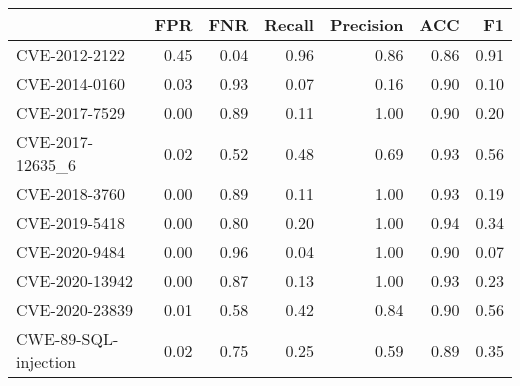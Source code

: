 \begin{tabular}{lrrrrrr}
\toprule
{} &  FPR &  FNR &  Recall &  Precision &  ACC &   F1 \\
\midrule
CVE-2012-2122        & 0.45 & 0.04 &    0.96 &       0.86 & 0.86 & 0.91 \\
CVE-2014-0160        & 0.03 & 0.93 &    0.07 &       0.16 & 0.90 & 0.10 \\
CVE-2017-7529        & 0.00 & 0.89 &    0.11 &       1.00 & 0.90 & 0.20 \\
CVE-2017-12635\_6     & 0.02 & 0.52 &    0.48 &       0.69 & 0.93 & 0.56 \\
CVE-2018-3760        & 0.00 & 0.89 &    0.11 &       1.00 & 0.93 & 0.19 \\
CVE-2019-5418        & 0.00 & 0.80 &    0.20 &       1.00 & 0.94 & 0.34 \\
CVE-2020-9484        & 0.00 & 0.96 &    0.04 &       1.00 & 0.90 & 0.07 \\
CVE-2020-13942       & 0.00 & 0.87 &    0.13 &       1.00 & 0.93 & 0.23 \\
CVE-2020-23839       & 0.01 & 0.58 &    0.42 &       0.84 & 0.90 & 0.56 \\
CWE-89-SQL-injection & 0.02 & 0.75 &    0.25 &       0.59 & 0.89 & 0.35 \\
\bottomrule
\end{tabular}
